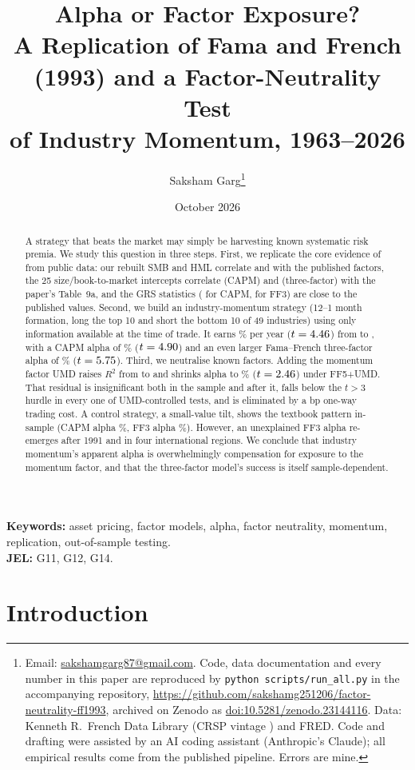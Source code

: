 \documentclass[11pt]{article}
\title{\textbf{Alpha or Factor Exposure?}\\[4pt]
\large A Replication of Fama and French (1993) and a Factor-Neutrality Test\\ of Industry Momentum, 1963--2026}
\author{Saksham Garg\thanks{Email: \href{mailto:sakshamgarg87@gmail.com}{sakshamgarg87@gmail.com}. Code, data documentation and every number in this paper are reproduced by \texttt{python scripts/run\_all.py} in the accompanying repository, \url{https://github.com/sakshamg251206/factor-neutrality-ff1993}, archived on Zenodo as \href{https://doi.org/10.5281/zenodo.23144116}{doi:10.5281/zenodo.23144116}. Data: Kenneth R.\ French Data Library (CRSP vintage \Vintage) and FRED. Code and drafting were assisted by an AI coding assistant (Anthropic's Claude); all empirical results come from the published pipeline. Errors are mine.}}
\date{October 2026}
\begin{document}
\maketitle

\begin{abstract}
\noindent
A strategy that beats the market may simply be harvesting known systematic risk premia. We study this question in three steps. First, we replicate the core evidence of \citet{FF1993} from public data: our rebuilt SMB and HML correlate \SmbCorr{} and \HmlCorr{} with the published factors, the 25 size/book-to-market intercepts correlate \CorrCapmAlphaRep{} (CAPM) and \CorrFfAlphaRep{} (three-factor) with the paper's Table~9a, and the GRS statistics (\GrsCapmIS{} for CAPM, \GrsFfIS{} for FF3) are close to the published values. Second, we build an industry-momentum strategy (12--1 month formation, long the top 10 and short the bottom 10 of 49 industries) using only information available at the time of trade. It earns \ImomMean\% per year ($t=4.46$) from \StartImom{} to \EndSample{}, with a CAPM alpha of \ImomCapmAlpha\% ($t=4.90$) and an even larger Fama--French three-factor alpha of \ImomFfAlpha\% ($t=5.75$). Third, we neutralise known factors. Adding the momentum factor UMD raises $R^2$ from \ImomFfR{} to \ImomFfUmdR{} and shrinks alpha to \ImomFfiveUmdAlpha\% ($t=2.46$) under FF5+UMD. That residual is insignificant both in the \citeauthor{FF1993} sample and after it, falls below the \citet{HLZ2016} $t>3$ hurdle in every one of \NUmdTests{} UMD-controlled tests, and is eliminated by a \CostBps{} bp one-way trading cost. A control strategy, a small-value tilt, shows the textbook pattern in-sample (CAPM alpha \SvCapmAlphaIS\%, FF3 alpha \SvFfAlphaIS\%). However, an unexplained FF3 alpha re-emerges after 1991 and in four international regions. We conclude that industry momentum's apparent alpha is overwhelmingly compensation for exposure to the momentum factor, and that the three-factor model's success is itself sample-dependent.
\end{abstract}

\noindent\textbf{Keywords:} asset pricing, factor models, alpha, factor neutrality, momentum, replication, out-of-sample testing.\\
\textbf{JEL:} G11, G12, G14.

\section{Introduction}
\end{document}
